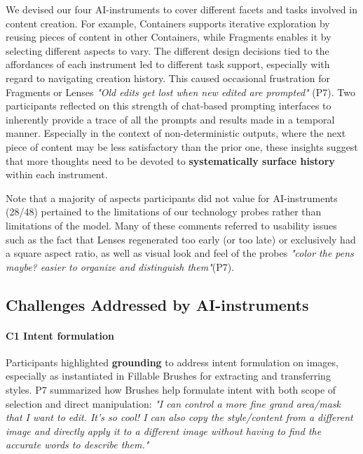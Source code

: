 We devised our four AI-instruments to cover different facets and tasks involved in  content creation. For example, Containers supports iterative exploration by reusing pieces of content in other Containers, while Fragments enables it by selecting different aspects to vary. The different design decisions tied to the affordances of each instrument led to different task support, especially with regard to navigating creation history.  This caused occasional frustration for Fragments or Lenses \textit{"Old edits get lost when new edited are prompted"} (P7). Two participants reflected on this strength of chat-based prompting interfaces to inherently provide a trace of all the prompts and results made in a temporal manner. Especially in the context of non-deterministic outputs, where the next piece of content may be less satisfactory than the prior one, these insights suggest that more thoughts need to be devoted to \textbf{systematically surface history} within each instrument. 



Note that a majority of aspects participants did not value for AI-instruments (28/48) pertained to the limitations of our technology probes rather than limitations of the model. Many of these comments referred to usability issues such as the fact that Lenses regenerated too early (or too late) or exclusively had a square aspect ratio, as well as visual look and feel of the probes \textit{"color the pens maybe? easier to organize and distinguish them"}(P7).




\subsection{Challenges Addressed by AI-instruments}


\paragraph{\textbf{C1 Intent formulation}}

Participants highlighted \textbf{grounding} to address intent formulation on images, especially as instantiated in Fillable Brushes for extracting and transferring styles.  P7 summarized how Brushes help formulate intent with both scope of selection and direct manipulation: \textit{"I can control a more fine grand area/mask that I want to edit. It's so cool! I can also copy the style/content from a different image and directly apply it to a different image without having to find the accurate words to describe them."}




